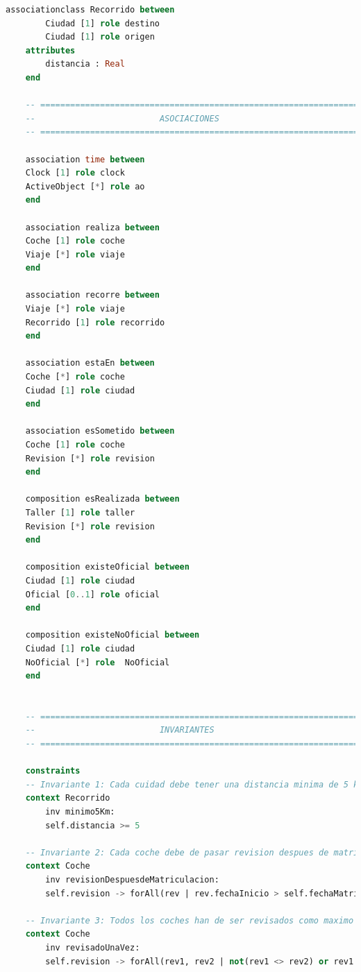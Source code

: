 \documentclass[12pt.a4paper]{article}
\begin{document}
\begin{lstlisting}[style = useNormal,language=SQL, caption={Codigo Use del apartado B}]
    associationclass Recorrido between
        Ciudad [1] role destino
        Ciudad [1] role origen
    attributes
        distancia : Real                         
    end 
    
    -- =====================================================================
    --                         ASOCIACIONES 
    -- =====================================================================
    
    association time between
    Clock [1] role clock
    ActiveObject [*] role ao
    end
    
    association realiza between
    Coche [1] role coche
    Viaje [*] role viaje
    end
    
    association recorre between
    Viaje [*] role viaje
    Recorrido [1] role recorrido
    end
    
    association estaEn between
    Coche [*] role coche
    Ciudad [1] role ciudad
    end
    
    association esSometido between
    Coche [1] role coche
    Revision [*] role revision
    end
    
    composition esRealizada between
    Taller [1] role taller
    Revision [*] role revision
    end
    
    composition existeOficial between
    Ciudad [1] role ciudad
    Oficial [0..1] role oficial
    end
    
    composition existeNoOficial between
    Ciudad [1] role ciudad
    NoOficial [*] role  NoOficial
    end
    
    
    -- =====================================================================
    --                         INVARIANTES
    -- =====================================================================
    
    constraints
    -- Invariante 1: Cada cuidad debe tener una distancia minima de 5 km de la otra.
    context Recorrido
        inv minimo5Km:
        self.distancia >= 5
    
    -- Invariante 2: Cada coche debe de pasar revision despues de matricularse y no antes.
    context Coche
        inv revisionDespuesdeMatriculacion:
        self.revision -> forAll(rev | rev.fechaInicio > self.fechaMatriculacion)
    
    -- Invariante 3: Todos los coches han de ser revisados como maximo en un momento dado.
    context Coche
        inv revisadoUnaVez:
        self.revision -> forAll(rev1, rev2 | not(rev1 <> rev2) or rev1.fechaInicio <> rev2.fechaInicio and (rev1.fechaInicio >= rev2.fechaFin or rev2.fechaInicio >= rev1.fechaFin) and (not(rev1.fechaFin = null and rev2.fechaFin = null)))
    

\end{lstlisting}
\end{document}
